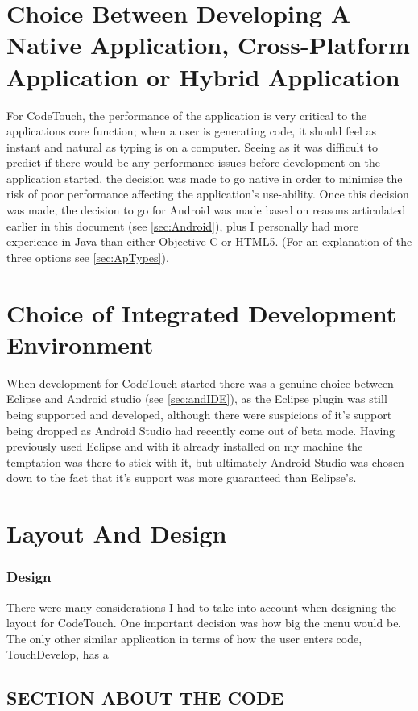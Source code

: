 \documentclass[ %
                    author={Jonathan Rankin},
                supervisor={Dr. David May, Dr. Ian Holyer},
                    degree={MEng},
                     title={CodeTouch},
                  subtitle={A Revolutionary Way To Program Real Code On Touch Screen Devices},
                      type={enterprise},
                      year={2015 } ]{dissertation}
\begin{document}
\section{Choice Between Developing A Native Application, Cross-Platform Application or Hybrid Application}
For CodeTouch, the performance of the application is very critical to the applications core function; when a user is generating code, it should feel as instant and natural as typing is on a computer. Seeing as it was difficult to predict if there would be any performance issues before development on the application started, the decision was made to go native in order to minimise the risk of poor performance affecting the application's use-ability. Once this decision was made, the decision to go for Android was made based on reasons articulated earlier in this document (see \ref{sec:Android}), plus I personally had more experience in Java than either Objective C or HTML5. (For an explanation of the three options see \ref{sec:ApTypes}).

\section{Choice of Integrated Development Environment}

When development for CodeTouch started there was a genuine choice between Eclipse and Android studio (see \ref{sec:andIDE}), as the Eclipse plugin was still being supported and developed, although there were suspicions of it's support being dropped as Android Studio had recently come out of beta mode. Having previously used Eclipse and with it already installed on my machine the temptation was there to stick with it, but ultimately Android Studio was chosen down to the fact that it's support was more guaranteed than Eclipse's.

\section{Layout And Design}
\subsubsection{Design}
There were many considerations I had to take into account when designing the layout for CodeTouch. One important decision was how big the menu would be. The only other similar application in terms of how the user enters code, TouchDevelop, has a 

\subsection{SECTION ABOUT THE CODE}
\end{document}
